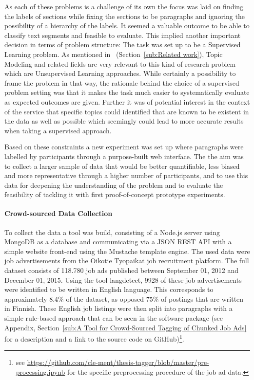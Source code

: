 As each of these problems is a challenge of its own the focus was laid on finding the labels of sections while fixing the sections to be paragraphs and ignoring the possibility of a hierarchy of the labels. It seemed a valuable outcome to be able to classify text segments and feasible to evaluate.
This implied another important decision in terms of problem structure: The task was set up to be a \gls{Supervised Learning} problem. As mentioned in~ (Section~\ref{sub:Related work}), \gls{Topic Modeling} and related fields are very relevant to this kind of research problem which are \gls{Unsupervised Learning} approaches.
While certainly a possibility to frame the problem in that way, the rationale behind the choice of a supervised problem setting was that it makes the task much easier to systematically evaluate as expected outcomes are given. Further it was of potential interest in the context of the service that specific topics could identified that are known to be existent in the data as well as possible which seemingly could lead to more accurate results when taking a supervised approach.

Based on these constraints a new experiment was set up where paragraphs were labelled by participants through a purpose-built web interface. The the aim was to collect a larger sample of data that would be better quantifiable, less biased and more representative through a higher number of participants, and to use this data for deepening the understanding of the problem and to evaluate the feasibility of tackling it with first proof-of-concept prototype experiments.

\paragraph{Crowd-sourced Data Collection}
\label{par:Crowd-sourced Data Collection}

To collect the data a tool was build, consisting of a \gls{Node.js} server using \gls{MongoDB} as a database and communicating via a \acrshort{JSON} \acrshort{REST} \acrshort{API} with a simple website front-end using the \gls{Mustache} template engine.
The used data were job advertisements from the \gls{Oikotie Tyopaikat} job recruitment platform. The full dataset consists of 118.780 job ads published between September 01, 2012 and December 01, 2015. Using the tool \gls{langdetect}, 9928 of these job advertisements were identified to be written in English language. This corresponds to approximately 8.4\% of the dataset, as opposed 75\% of postings that are written in Finnish. These English job listings were then split into paragraphs with a simple rule-based approach that can be seen in the software package (see Appendix, Section~\ref{sub:A Tool for Crowd-Sourced Tagging of Chunked Job Ads} for a description and a link to the source code on \gls{GitHub})\footnote{see \url{https://github.com/cle-ment/thesis-tagger/blob/master/pre-processing.ipynb} for the specific preprocessing procedure of the job ad data.}.

